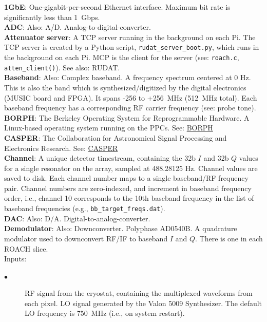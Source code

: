 \noindent
\textbf{1GbE}: One-gigabit-per-second Ethernet interface. Maximum bit rate is significantly less than 1~Gbps.\\
\textbf{ADC}: Also: A/D. Analog-to-digital-converter.\\
\textbf{Attenuator server}: A TCP server running in the background on each Pi. The TCP server is created by a Python script, \texttt{rudat\_server\_boot.py}, which runs in the background on each Pi. MCP is the client for the server (see: \texttt{roach.c}, \texttt{atten\_client()}). See also: RUDAT.\\
\textbf{Baseband}: Also: Complex baseband. A frequency spectrum centered at 0 Hz. This is also the band which is synthesized/digitized by the digital electronics (MUSIC board and FPGA). It spans -256 to +256~MHz (512~MHz total). Each baseband frequency has a corresponding RF carrier frequency (see: probe tone).\\
\textbf{BORPH}: The Berkeley Operating System for Reprogrammable Hardware. A Linux-based operating system running on the PPCs. See: \href{https://casper.ssl.berkeley.edu/wiki/BORPH}{BORPH}\\
\textbf{CASPER}: The Collaboration for Astronomical Signal Processing and Electronics Research. See: \href{https://casper.berkeley.edu}{CASPER}\\
\textbf{Channel}: A unique detector timestream, containing the 32b $I$ and 32b $Q$ values for a single resonator on the array, sampled at 488.28125 Hz. Channel values are saved to disk. Each channel number maps to a single baseband/RF frequency pair. Channel numbers are zero-indexed, and increment in baseband frequency order, i.e., channel 10 corresponds to the 10th baseband frequency in the list of baseband frequencies (e.g., \texttt{bb\_target\_freqs.dat}).\\
\textbf{DAC}: Also: D/A. Digital-to-analog-converter.\\
\textbf{Demodulator}: Also: Downconverter. Polyphase AD0540B. A quadrature modulator used to downconvert RF/IF to baseband $I$ and $Q$. There is one in each ROACH slice.\\
Inputs:
\begin{description}
  \item[$\bullet$] RF signal from the cryostat, containing the multiplexed waveforms from each pixel. LO signal generated by the Valon 5009 Synthesizer. The default LO frequency is 750~MHz (i.e., on system restart).
\end{description}
